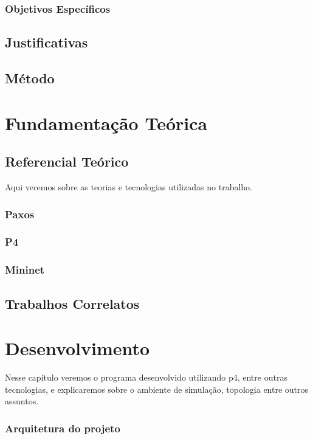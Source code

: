 \documentclass[12pt,
openright, 
oneside,
a4paper,
brazil]{facom-ufu-abntex2}
\begin{document}
\subsection{Objetivos Específicos}

\section{Justificativas}
\section{Método}

\chapter{Fundamentação Teórica}
\section{Referencial Teórico}
Aqui veremos sobre as teorias e tecnologias utilizadas no trabalho.
\subsection{Paxos}
\subsection{P4}
\subsection{Mininet}


\section{Trabalhos Correlatos}


\chapter{Desenvolvimento}
Nesse capítulo veremos o programa desenvolvido utilizando p4, entre outras tecnologias, e explicaremos sobre o ambiente de simulação, topologia entre outros assuntos.
 
\subsection{Arquitetura do projeto}
\end{document}
